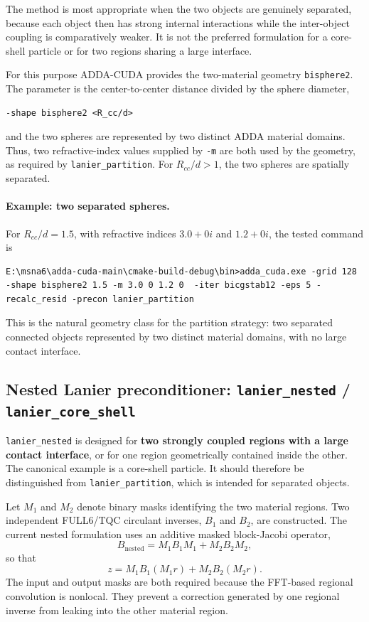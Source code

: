 \documentclass[11pt,a4paper]{article}
\begin{document}
The method is most appropriate when the two objects are genuinely separated, because each object then has strong internal interactions while the inter-object coupling is comparatively weaker. It is not the preferred formulation for a core-shell particle or for two regions sharing a large interface.

For this purpose ADDA-CUDA provides the two-material geometry \texttt{bisphere2}. The parameter is the center-to-center distance divided by the sphere diameter,
\begin{verbatim}
-shape bisphere2 <R_cc/d>
\end{verbatim}
and the two spheres are represented by two distinct ADDA material domains. Thus, two refractive-index values supplied by \texttt{-m} are both used by the geometry, as required by \texttt{lanier\_partition}. For \(R_{cc}/d>1\), the two spheres are spatially separated.

\paragraph{Example: two separated spheres.}
For \(R_{cc}/d=1.5\), with refractive indices \(3.0+0i\) and \(1.2+0i\), the tested command is
\begin{Verbatim}[breaklines=true,breakanywhere=true,fontsize=\small]
E:\msna6\adda-cuda-main\cmake-build-debug\bin>adda_cuda.exe -grid 128 -shape bisphere2 1.5 -m 3.0 0 1.2 0  -iter bicgstab12 -eps 5 -recalc_resid -precon lanier_partition
\end{Verbatim}
This is the natural geometry class for the partition strategy: two separated connected objects represented by two distinct material domains, with no large contact interface.

\subsection{Nested Lanier preconditioner: \texttt{lanier\_nested} / \texttt{lanier\_core\_shell}}

\texttt{lanier\_nested} is designed for \textbf{two strongly coupled regions with a large contact interface}, or for one region geometrically contained inside the other. The canonical example is a core-shell particle. It should therefore be distinguished from \texttt{lanier\_partition}, which is intended for separated objects.

Let \(M_1\) and \(M_2\) denote binary masks identifying the two material regions. Two independent FULL6/TQC circulant inverses, \(B_1\) and \(B_2\), are constructed. The current nested formulation uses an additive masked block-Jacobi operator,
\begin{equation}
B_{\mathrm{nested}}
=
M_1B_1M_1+M_2B_2M_2,
\end{equation}
so that
\begin{equation}
z=M_1B_1(M_1r)+M_2B_2(M_2r).
\end{equation}
The input and output masks are both required because the FFT-based regional convolution is nonlocal. They prevent a correction generated by one regional inverse from leaking into the other material region.
\end{document}
